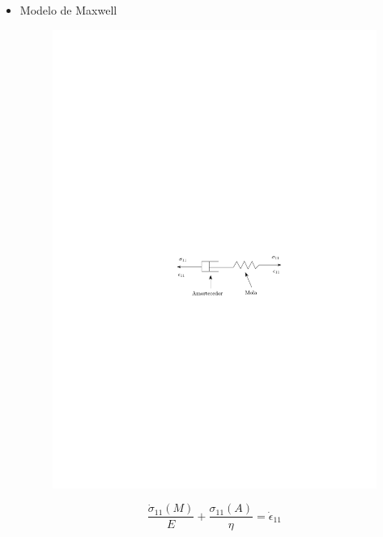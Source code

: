 \documentclass[a4paper, 12pt, brazilian]{article}
\begin{document}
\begin{itemize}
		\begin{itemize}
			\item Modelo de Maxwell	
			\begin{figure}[H]
				\centering
				\includegraphics[scale=1.1]{images/maxwell}
			\end{figure}
			
			\begin{equation}
			\dfrac{\dot{\sigma}_{11}(M)}{E}+\dfrac{\sigma_{11}(A)}{\eta}=\dot{\epsilon}_{11}
			\end{equation}
			

\end{itemize}
\end{itemize}
\end{document}

